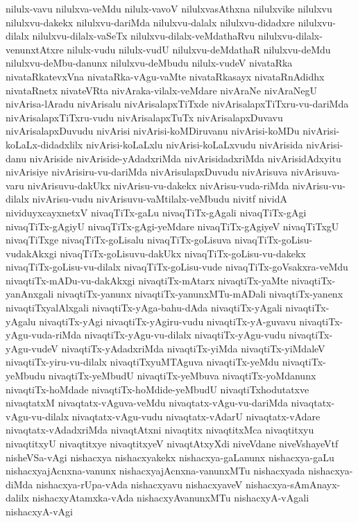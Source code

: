{nilulx-vavu
nilulxva-veMdu
nilulx-vavoV
nilulxvasAthxna
nilulxvike
nilulxvu
nilulxvu-dakekx
nilulxvu-dariMda
nilulxvu-dalalx
nilulxvu-didadxre
nilulxvu-dilalx
nilulxvu-dilalx-vaSeTx
nilulxvu-dilalx-veMdathaRvu
nilulxvu-dilalx-venunxtAtxre
nilulx-vudu
nilulx-vudU
nilulxvu-deMdathaR
nilulxvu-deMdu
nilulxvu-deMbu-danunx
nilulxvu-deMbudu
nilulx-vudeV
nivataRka
nivataRkatevxVna
nivataRka-vAgu-vaMte
nivataRkasayx
nivataRnAdidhx
nivataRnetx
nivateVRta
nivAraka-vilalx-veMdare
nivAraNe
nivAraNegU
nivArisa-lAradu
nivArisalu
nivArisalapxTiTxde
nivArisalapxTiTxru-vu-dariMda
nivArisalapxTiTxru-vudu
nivArisalapxTuTx
nivArisalapxDuvavu
nivArisalapxDuvudu
nivArisi
nivArisi-koMDiruvanu
nivArisi-koMDu
nivArisi-koLaLx-didadxlilx
nivArisi-koLaLxlu
nivArisi-koLaLxvudu
nivArisida
nivArisi-danu
nivAriside
nivAriside-yAdadxriMda
nivArisidadxriMda
nivArisidAdxyitu
nivArisiye
nivArisiru-vu-dariMda
nivArisulapxDuvudu
nivArisuva
nivArisuva-varu
nivArisuvu-dakUkx
nivArisu-vu-dakekx
nivArisu-vuda-riMda
nivArisu-vu-dilalx
nivArisu-vudu
nivArisuvu-vaMtilalx-veMbudu
nivitf
nividA
nividuyxcayxnetxV
nivaqTiTx-gaLu
nivaqTiTx-gAgali
nivaqTiTx-gAgi
nivaqTiTx-gAgiyU
nivaqTiTx-gAgi-yeMdare
nivaqTiTx-gAgiyeV
nivaqTiTxgU
nivaqTiTxge
nivaqTiTx-goLisalu
nivaqTiTx-goLisuva
nivaqTiTx-goLisu-vudakAkxgi
nivaqTiTx-goLisuvu-dakUkx
nivaqTiTx-goLisu-vu-dakekx
nivaqTiTx-goLisu-vu-dilalx
nivaqTiTx-goLisu-vude
nivaqTiTx-goVsakxra-veMdu
nivaqtiTx-mADu-vu-dakAkxgi
nivaqtiTx-mAtarx
nivaqtiTx-yaMte
nivaqtiTx-yanAnxgali
nivaqtiTx-yanunx
nivaqtiTx-yanunxMTu-mADali
nivaqtiTx-yanenx
nivaqtiTxyalAlxgali
nivaqtiTx-yAga-bahu-dAda
nivaqtiTx-yAgali
nivaqtiTx-yAgalu
nivaqtiTx-yAgi
nivaqtiTx-yAgiru-vudu
nivaqtiTx-yA-guvavu
nivaqtiTx-yAgu-vuda-riMda
nivaqtiTx-yAgu-vu-dilalx
nivaqtiTx-yAgu-vudu
nivaqtiTx-yAgu-vudeV
nivaqtiTx-yAdadxriMda
nivaqtiTx-yiMda
nivaqtiTx-yiMdaleV
nivaqtiTx-yiru-vu-dilalx
nivaqtiTxyuMTAguva
nivaqtiTx-yeMdu
nivaqtiTx-yeMbudu
nivaqtiTx-yeMbudU
nivaqtiTx-yeMbuva
nivaqtiTx-yoMdanunx
nivaqtiTx-hoMdade
nivaqtiTx-hoMdide-yeMbudU
nivaqtiTxhodutatxve
nivaqtatxM
nivaqtatx-vAguva-veMdu
nivaqtatx-vAgu-vu-dariMda
nivaqtatx-vAgu-vu-dilalx
nivaqtatx-vAgu-vudu
nivaqtatx-vAdarU
nivaqtatx-vAdare
nivaqtatx-vAdadxriMda
nivaqtAtxni
nivaqtitx
nivaqtitxMca
nivaqtitxyu
nivaqtitxyU
nivaqtitxye
nivaqtitxyeV
nivaqtAtxyXdi
niveVdane
niveVshayeVtf
nisheVSa-vAgi
nishacxya
nishacxyakekx
nishacxya-gaLanunx
nishacxya-gaLu
nishacxyajAcnxna-vanunx
nishacxyajAcnxna-vanunxMTu
nishacxyada
nishacxya-diMda
nishacxya-rUpa-vAda
nishacxyavu
nishacxyaveV
nishacxya-sAmAnayx-dalilx
nishacxyAtamxka-vAda
nishacxyAvanunxMTu
nishacxyA-vAgali
nishacxyA-vAgi
}
